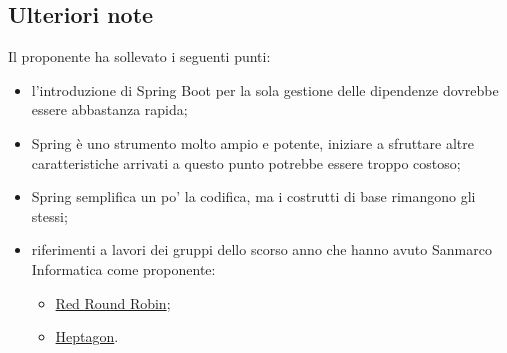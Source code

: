 \subsection{Ulteriori note}
    Il proponente ha sollevato i seguenti punti:
    \begin{itemize}
        \item l'introduzione di Spring Boot per la sola gestione delle dipendenze dovrebbe essere abbastanza rapida;
        \item Spring è uno strumento molto ampio e potente, iniziare a sfruttare altre caratteristiche arrivati a questo punto potrebbe essere troppo costoso;
        \item Spring semplifica un po' la codifica, ma i costrutti di base rimangono gli stessi;
        \item riferimenti a lavori dei gruppi dello scorso anno che hanno avuto Sanmarco Informatica come proponente:
        \begin{itemize}
            \item \href{https://github.com/RedRoundRobin/riot/tree/master/\_documentazione/Documenti\%20esterni/Manuale\%20del\%20Manutentore/Immagini}{Red Round Robin};
            \item \href{https://github.com/heptagon-group/ThiReMa}{Heptagon}.
        \end{itemize}
    \end{itemize}